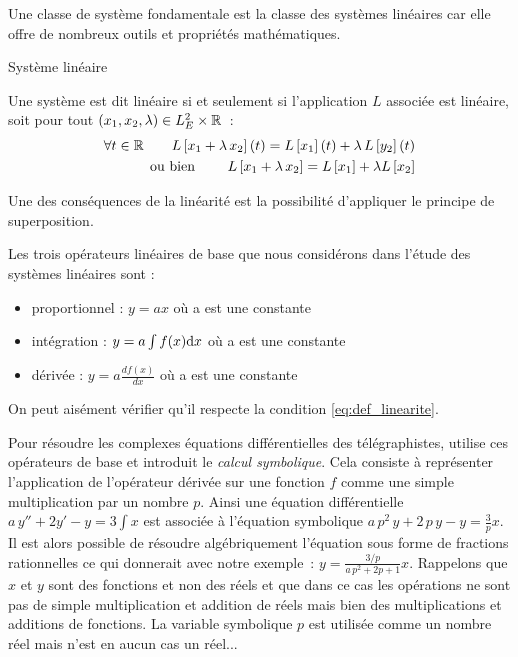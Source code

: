 \begin{remark}{}
	Une classe de système fondamentale est la classe des systèmes
        linéaires car elle offre de nombreux outils et propriétés
        mathématiques.
	\begin{definition}{Système linéaire}
          \label{def:linearite}
          
          Une système est dit linéaire si et seulement si
          l'application $L$ associée est linéaire, soit pour tout
          $\left(x_1,x_2,\lambda\right) \in L_E^2 \times \mathbb{R}$~:
          \begin{eqnarray}
            \label{eq:def_linearite}
	    \forall t \in \mathbb{R} \qquad L\left[x_1 + \lambda\, x_2\right](t) = L\left[x_1\right](t) + \lambda\,L\left[y_2\right](t) \nonumber\\
	    \text{ou bien } \qquad L\left[x_1 + \lambda\,x_2\right] = L\left[x_1\right] +\lambda L\left[x_2 \right]
          \end{eqnarray}
	\end{definition}
	

	Une des conséquences de la linéarité est la possibilité
        d'appliquer le principe de superposition.
	
	Les trois opérateurs linéaires de base que nous considérons
        dans l'étude des systèmes linéaires sont :
	\begin{itemize}
        \item proportionnel : $y = a x$ où a est une constante
        \item intégration : $y = a \int f(x) \mathrm{d{}} x $ où a est
          une constante
        \item dérivée : $y = a \frac{df(x)}{dx} $ où a est une
          constante
	\end{itemize}
	On peut aisément vérifier qu'il respecte la condition
        \ref{eq:def_linearite}.

        \begin{remarque}
          Pour résoudre les complexes équations différentielles des
          télégraphistes, \Heaviside{} utilise ces opérateurs de base
          et introduit le \emph{calcul symbolique}. Cela consiste à
          représenter l'application de l'opérateur dérivée sur une
          fonction $f$ comme une simple multiplication par un nombre
          $p$. Ainsi une équation différentielle
          $a\,y'' + 2y' -y = 3\int x$ est associée à l'équation
          symbolique $a\,p^2\,y + 2\,p\,y - y = \frac{3}{p}x$. Il est
          alors possible de résoudre algébriquement l'équation sous
          forme de fractions rationnelles ce qui donnerait avec notre
          exemple~: $y = \frac{3/p}{a\,p^2+2p+1} x$. Rappelons que $x$
          et $y$ sont des fonctions et non des réels et que dans ce
          cas les opérations ne sont pas de simple multiplication et
          addition de réels mais bien des multiplications et additions
          de fonctions. La variable symbolique $p$ est utilisée comme
          un nombre réel mais n'est en aucun cas un réel...
        \end{remarque}
	

\end{remark}
